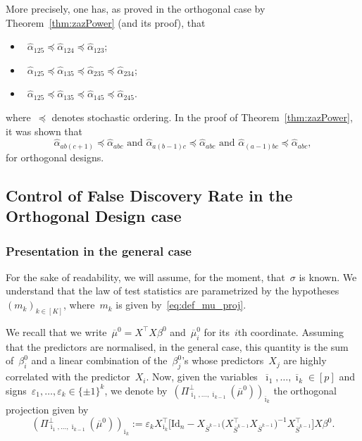 \documentclass[final,numbib]{imaiai}%
\numberwithin{equation}{section}
\def\eq{\begin{equation}}
\def\qe{\end{equation}}
\renewcommand{\bar}{\overline}
\renewcommand{\hat}{\widehat}
\newcommand{\<}{\langle}
\renewcommand{\>}{\rangle}
\newcommand{\1}{\mathds{1}}
\begin{document}
{\newpage

\noindent
More precisely, one has, as proved in the orthogonal case by Theorem~\ref{thm:zazPower} (and its proof),  that 
\begin{itemize}
\item~$\hat \alpha_{125} \preccurlyeq \hat \alpha_{124}\preccurlyeq \hat\alpha_{123}$;
\item~$\hat\alpha_{125} \preccurlyeq  \hat\alpha_{135} \preccurlyeq \hat\alpha_{235} \preccurlyeq \hat\alpha_{234}$;
\item~$\hat\alpha_{125} \preccurlyeq \hat\alpha_{135} \preccurlyeq \hat\alpha_{145}\preccurlyeq \hat\alpha_{245}$.
\end{itemize}
where~$\preccurlyeq$ denotes stochastic ordering.
In the proof of Theorem~\ref{thm:zazPower}, it was shown that 
\[
\hat \alpha_{ab(c+1)}\preccurlyeq \hat \alpha_{abc}\text{ and }
\hat \alpha_{a(b-1)c}\preccurlyeq \hat \alpha_{abc}\text{ and }
\hat \alpha_{(a-1)bc}\preccurlyeq \hat \alpha_{abc},
\]
for orthogonal designs.


\subsection{Control of False Discovery Rate in the Orthogonal Design case}
\label{sec:FDR}

\subsubsection{Presentation in the general case}
\label{hyp:FDR} 

 For the sake of readability, we will assume, for the moment,  that~$\sigma$ is known. We understand that the law of test statistics are parametrized by the hypotheses~$(m_k)_{k\in[K]}$, where~$m_k$ is given by~\eqref{eq:def_mu_proj}.

We recall that we write~$\bar\mu^0=X^\top X \beta^0$ and~$\bar\mu^0_i$ for its~$i$th coordinate.
Assuming that the predictors are normalised, in the general case, this quantity is the sum of~$\beta_i^0$ and a linear combination of the~$\beta_j^0$'s whose predictors~$X_j$ are highly correlated with the predictor~$X_i$.
Now, given the variables~$\bar\imath_1,\ldots,\bar\imath_{k}\in[p]$ and signs~$\varepsilon_{1},\ldots,\varepsilon_{{k}}\in\{\pm1\}^{k}$, we denote by~$(\Pi_{ \bar \imath_1,\ldots, \bar \imath_{k-1}}^\perp (\bar\mu^0))_{\bar\imath_{k}}$ the orthogonal projection given by
\eq
\label{eq:ortho_mu}
(\Pi_{ \bar \imath_1,\ldots, \bar \imath_{k-1}}^\perp (\bar\mu^0))_{\bar\imath_{k}}
:=\varepsilon_{{k}}X_{\bar \imath_k}^\top \Big[\mathrm{Id}_{n}-X_{\bar S^{k-1}}\big(X_{\bar S^{k-1}}^\top X_{\bar S^{k-1}}\big)^{-1}\!\!X_{\bar S^{k-1}}^\top\Big] X\beta^0.
\qe

}
\end{document}
